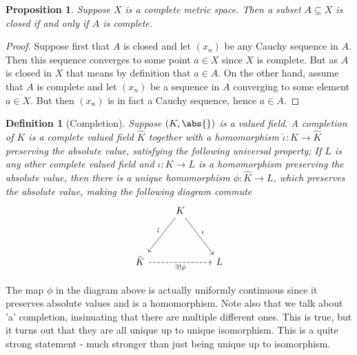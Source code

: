 \documentclass{article}
\newtheorem{definition}{Definition}[section]
\newtheorem{proposition}{Proposition}[section]
\numberwithin{equation}{section}
\begin{document}
\begin{proposition}
    Suppose $X$ is a complete metric space. Then a subset $A \subseteq X$ is closed if and only if $A$ is complete.
\end{proposition}
\begin{proof}
    Suppose first that $A$ is closed and let $(x_n)$ be any Cauchy sequence in $A$. Then this sequence converges to some point $a \in X$ since $X$ is complete. But as $A$ is closed in $X$ that means by definition that $a \in A$. On the other hand, assume that $A$ is complete and let $(x_n)$ be a sequence in $A$ converging to some element $a \in X$. But then $(x_n)$ is in fact a Cauchy sequence, hence $a \in A$.
\end{proof}

\begin{definition}[Completion]
    Suppose $(K, \abs{})$ is a valued field. A completion of $K$ is a complete valued field $\hat K$ together with a homomorphism $\hat \iota : K \to \hat K$ preserving the absolute value, satisfying the following universal property; If $L$ is any other complete valued field and $\iota : K \to L$ is a homomorphism preserving the absolute value, then there is a unique homomorphism $\phi : \hat K \to L$, which preserves the absolute value, making the following diagram commute
    \[\begin{tikzcd}
            & K \\
            \\
            \hat K && L
            \arrow["{\exists! \phi}"', dashed, from=3-1, to=3-3]
            \arrow["{\hat \iota}"', from=1-2, to=3-1]
            \arrow["{\iota}", from=1-2, to=3-3]
        \end{tikzcd}\]
\end{definition}
The map $\phi$ in the diagram above is actually uniformly continuous since it preserves absolute values and is a homomorphism. Note also that we talk about 'a' completion, insinuating that there are multiple different ones. This is true, but it turns out that they are all unique up to unique isomorphism. This is a quite strong statement - much stronger than just being unique up to isomorphism.

\end{document}
